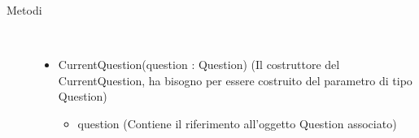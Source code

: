 \begin{description}
\item[Metodi] \hfill \\
 \vspace{-7mm}
\begin{itemize}
\item CurrentQuestion(question : Question) (Il costruttore del CurrentQuestion, ha bisogno per essere costruito del parametro di tipo Question)\begin{itemize}
\item question (Contiene il riferimento all'oggetto Question associato)
\end{itemize}

\end{itemize}

\end{description}

\vspace{0.5cm}
\hypertarget{client::model::util::CurrentQuestionnaire}{}
